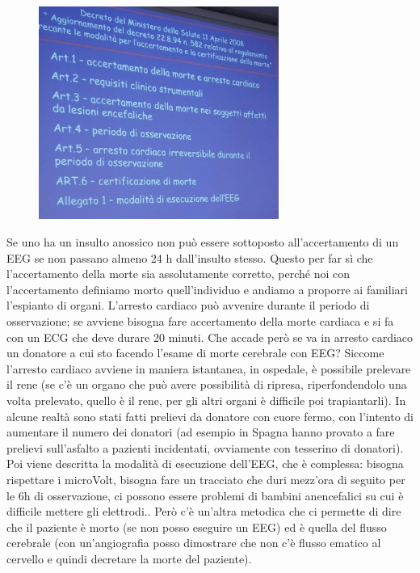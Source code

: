 \begin{figure}[!ht]
\centering
	\includegraphics[width=0.7\textwidth]{34/image2.jpeg}
	\end{figure}

Se uno ha un insulto anossico non può essere sottoposto all'accertamento
di un EEG se non passano almeno 24 h dall'insulto stesso. Questo per far
sì che l'accertamento della morte sia assolutamente corretto, perché noi
con l'accertamento definiamo morto quell'individuo e andiamo a proporre
ai familiari l'espianto di organi. L'arresto cardiaco può avvenire
durante il periodo di osservazione; se avviene bisogna fare accertamento
della morte cardiaca e si fa con un ECG che deve durare 20 minuti. Che
accade però se va in arresto cardiaco un donatore a cui sto facendo
l'esame di morte cerebrale con EEG? Siccome l'arresto cardiaco avviene
in maniera istantanea, in ospedale, è possibile prelevare il rene (se
c'è un organo che può avere possibilità di ripresa, riperfondendolo una
volta prelevato, quello è il rene, per gli altri organi è difficile poi
trapiantarli). In alcune realtà sono stati fatti prelievi da donatore
con cuore fermo, con l'intento di aumentare il numero dei donatori (ad
esempio in Spagna hanno provato a fare prelievi sull'asfalto a pazienti
incidentati, ovviamente con tesserino di donatori).
\\
Poi viene descritta la modalità di esecuzione dell'EEG, che è complessa:
bisogna rispettare i microVolt, bisogna fare un tracciato che duri
mezz'ora di seguito per le 6h di osservazione, ci possono essere
problemi di bambini anencefalici su cui è difficile mettere gli
elettrodi.. Però c'è un'altra metodica che ci permette di dire che il
paziente è morto (se non posso eseguire un EEG) ed è quella del flusso
cerebrale (con un'angiografia posso dimostrare che non c'è flusso
ematico al cervello e quindi decretare la morte del paziente).
\\
